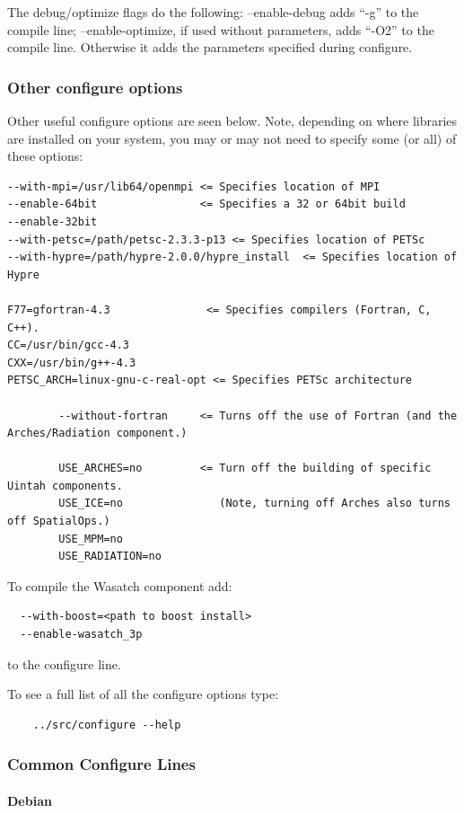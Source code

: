 \documentclass[12pt]{article}
\begin{document}
The debug/optimize flags do the following:  --enable-debug adds ``-g''
to the compile line; --enable-optimize, if used without parameters,
adds ``-O2'' to the compile line.  Otherwise it adds the parameters
specified during configure.

\subsubsection{Other configure options}

Other useful configure options are seen below.  Note, depending on
where libraries are installed on your system, you may or may not need
to specify some (or all) of these options:

\begin{verbatim}
--with-mpi=/usr/lib64/openmpi <= Specifies location of MPI
--enable-64bit                <= Specifies a 32 or 64bit build
--enable-32bit
--with-petsc=/path/petsc-2.3.3-p13 <= Specifies location of PETSc
--with-hypre=/path/hypre-2.0.0/hypre_install  <= Specifies location of Hypre

F77=gfortran-4.3               <= Specifies compilers (Fortran, C, C++).
CC=/usr/bin/gcc-4.3
CXX=/usr/bin/g++-4.3
PETSC_ARCH=linux-gnu-c-real-opt <= Specifies PETSc architecture

        --without-fortran     <= Turns off the use of Fortran (and the Arches/Radiation component.)

        USE_ARCHES=no         <= Turn off the building of specific Uintah components.
        USE_ICE=no               (Note, turning off Arches also turns off SpatialOps.)
        USE_MPM=no
        USE_RADIATION=no

\end{verbatim}
To compile the Wasatch component add:
\begin{verbatim}
  --with-boost=<path to boost install>
  --enable-wasatch_3p
\end{verbatim}
to the configure line.

To see a full list of all the configure options type:

\begin{verbatim}
    ../src/configure --help
\end{verbatim}

\subsubsection{Common Configure Lines}

\paragraph{Debian}
\end{document}
